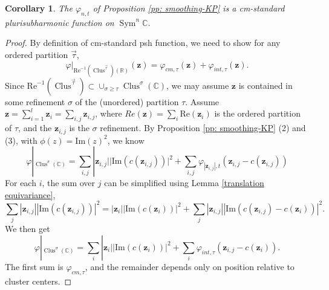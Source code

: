 \documentclass{article}
\def\R{\mathbb{R}}
\def\C{\mathbb{C}}
\def\In{\subset}
\DeclareMathOperator{\Sym}{Sym}
\DeclareMathOperator{\Clus}{Clus}
\renewcommand{\Im}{\mathrm{Im}}
\renewcommand{\Re}{\mathrm{Re}}
\def\bz{\mathbf{z}} %
\newtheorem{corollary}[theorem]{Corollary}
\theoremstyle{definition}
\begin{document}
\begin{corollary}
 The    $\varphi_{n, t}$ of Proposition \ref{pp: smoothing-KP} is a cm-standard plurisubharmonic function on $\Sym^n \C$. 
\end{corollary}
\begin{proof}
By definition of cm-standard psh function, we need to show for any ordered partition $\vec \tau$, $$\varphi|_{\Re^{-1}(\Clus^{\vec \tau})(\R)}(\bz) = \varphi_{cm,\tau}(\bz) + \varphi_{int,\tau}(\bz).$$ 
Since $\Re^{-1}(\Clus^{\vec \tau}) \In \cup_{\sigma \geq \tau} \Clus^\sigma(\C)$, we may assume $\bz$ is contained in some refinement $\sigma$ of the (unordered) partition $\tau$. Assume $\bz = \sum_{i=1}^l \bz_i = \sum_{i,j} \bz_{i,j}$, where $Re(\bz) = \sum_{i} \Re(\bz_i)$ is the ordered partition of $\tau$, and the $\bz_{i,j}$ is the $\sigma$ refinement. By Proposition \ref{pp: smoothing-KP} (2) and (3), with $\phi(z) = \Im(z)^2$, we know
$$ \varphi|_{\Clus^\sigma(\C)} = \sum_{i,j} |\bz_{i,j}| |\Im(c(\bz_{i,j}))|^2 + \sum_{i,j} \varphi_{| \bz_{i,j}|,t}(\bz_{i,j} - c(\bz_{i,j})) $$
For each $i$, the sum over $j$ can be simplified using Lemma \ref{translation equivariance}, 
$$ \sum_{j} |\bz_{i,j}| |\Im(c(\bz_{i,j}))|^2 = |\bz_{i}| |\Im(c(\bz_i))|^2 + \sum_{j} |\bz_{i,j}| |\Im(c(\bz_{i,j}) - c(\bz_{i}))|^2. $$
We then get
$$ \varphi|_{\Clus^\sigma(\C)} = \sum_{i} |\bz_{i}| |\Im(c(\bz_i))|^2 + \sum_i \varphi_{int,\tau}(\bz_{i,j} - c(\bz_i)). $$
The first sum is $\varphi_{cm,\tau}$, and the remainder depends only on position relative to cluster centers. 
\end{proof}
\end{document}
